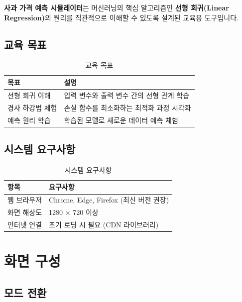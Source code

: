 \documentclass[11pt,a4paper]{article}
\begin{document}
\textbf{사과 가격 예측 시뮬레이터}는 머신러닝의 핵심 알고리즘인 \textbf{선형 회귀(Linear Regression)}의 
원리를 직관적으로 이해할 수 있도록 설계된 교육용 도구입니다.

\subsection{교육 목표}

\begin{table}[H]
\centering
\caption{교육 목표}
\label{tab:edu_goals}
\begin{tabularx}{\textwidth}{l|X}
\toprule
\textbf{목표} & \textbf{설명} \\
\midrule
선형 회귀 이해 & 입력 변수와 출력 변수 간의 선형 관계 학습 \\
경사 하강법 체험 & 손실 함수를 최소화하는 최적화 과정 시각화 \\
예측 원리 학습 & 학습된 모델로 새로운 데이터 예측 체험 \\
\bottomrule
\end{tabularx}
\end{table}

\subsection{시스템 요구사항}

\begin{table}[H]
\centering
\caption{시스템 요구사항}
\label{tab:system_req}
\begin{tabularx}{\textwidth}{l|X}
\toprule
\textbf{항목} & \textbf{요구사항} \\
\midrule
웹 브라우저 & Chrome, Edge, Firefox (최신 버전 권장) \\
화면 해상도 & 1280 × 720 이상 \\
인터넷 연결 & 초기 로딩 시 필요 (CDN 라이브러리) \\
\bottomrule
\end{tabularx}
\end{table}

\section{화면 구성}

\subsection{모드 전환}
\end{document}
